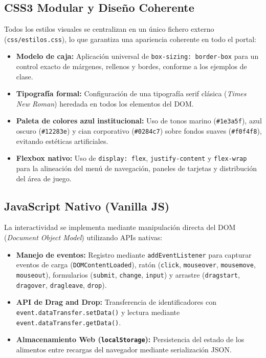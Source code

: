 \documentclass[11pt,a4paper]{article}
\begin{document}
\subsection{CSS3 Modular y Diseño Coherente}
Todos los estilos visuales se centralizan en un único fichero externo (\texttt{css/estilos.css}), lo que garantiza una apariencia coherente en todo el portal:
\begin{itemize}
    \item \textbf{Modelo de caja:} Aplicación universal de \texttt{box-sizing: border-box} para un control exacto de márgenes, rellenos y bordes, conforme a los ejemplos de clase.
    \item \textbf{Tipografía formal:} Configuración de una tipografía serif clásica (\textit{Times New Roman}) heredada en todos los elementos del DOM.
    \item \textbf{Paleta de colores azul institucional:} Uso de tonos marino (\texttt{\#1e3a5f}), azul oscuro (\texttt{\#12283e}) y cian corporativo (\texttt{\#0284c7}) sobre fondos suaves (\texttt{\#f0f4f8}), evitando estéticas artificiales.
    \item \textbf{Flexbox nativo:} Uso de \texttt{display: flex}, \texttt{justify-content} y \texttt{flex-wrap} para la alineación del menú de navegación, paneles de tarjetas y distribución del área de juego.
\end{itemize}

\subsection{JavaScript Nativo (Vanilla JS)}
La interactividad se implementa mediante manipulación directa del DOM (\textit{Document Object Model}) utilizando APIs nativas:
\begin{itemize}
    \item \textbf{Manejo de eventos:} Registro mediante \texttt{addEventListener} para capturar eventos de carga (\texttt{DOMContentLoaded}), ratón (\texttt{click}, \texttt{mouseover}, \texttt{mousemove}, \texttt{mouseout}), formularios (\texttt{submit}, \texttt{change}, \texttt{input}) y arrastre (\texttt{dragstart}, \texttt{dragover}, \texttt{dragleave}, \texttt{drop}).
    \item \textbf{API de Drag and Drop:} Transferencia de identificadores con \texttt{event.dataTransfer.setData()} y lectura mediante \texttt{event.dataTransfer.getData()}.
    \item \textbf{Almacenamiento Web (\texttt{localStorage}):} Persistencia del estado de los alimentos entre recargas del navegador mediante serialización JSON.
\end{itemize}
\end{document}
